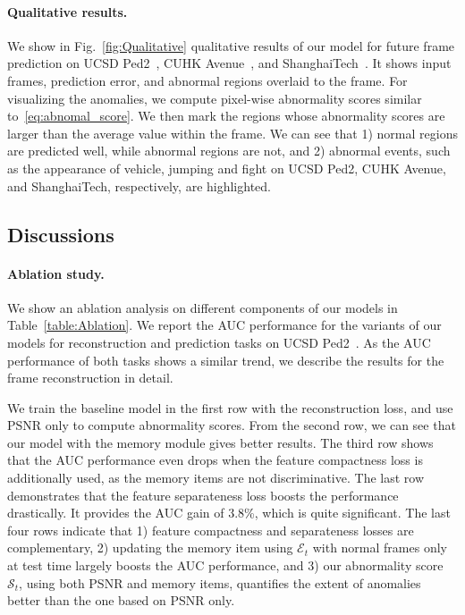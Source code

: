 \documentclass[10pt,twocolumn,letterpaper]{article}
\begin{document}
		
\vspace{-0.4cm}
		\paragraph{Qualitative results.}
We show in Fig.~\ref{fig:Qualitative} qualitative results of our model for future frame prediction on UCSD Ped2~\cite{li2013anomaly}, CUHK Avenue~\cite{lu2013abnormal}, and ShanghaiTech~\cite{luo2017revisit}. It shows input frames, prediction error, and abnormal regions overlaid to the frame. For visualizing the anomalies, we compute pixel-wise abnormality scores similar to~\eqref{eq:abnomal_score}. We then mark the regions whose abnormality scores are larger than the average value within the frame. We can see that 1) normal regions are predicted well, while abnormal regions are not, and 2) abnormal events, such as the appearance of vehicle, jumping and fight on UCSD Ped2, CUHK Avenue, and ShanghaiTech, respectively, are highlighted.



			
	
	
	\subsection{Discussions}\label{sec:discussion}
\vspace{-0.1cm}
		\paragraph{Ablation study.}
			We show an ablation analysis on different components of our models in Table~\ref{table:Ablation}. We report the AUC performance for the variants of our models for reconstruction and prediction tasks on UCSD Ped2~\cite{li2013anomaly}. As the AUC performance of both tasks shows a similar trend, we describe the results for the frame reconstruction in detail. 

We train the baseline model in the first row with the reconstruction loss, and use PSNR only to compute abnormality scores. From the second row, we can see that our model with the memory module gives better results. The third row shows that the AUC performance even drops when the feature compactness loss is additionally used, as the memory items are not discriminative. The last row demonstrates that the feature separateness loss boosts the performance drastically. It provides the AUC gain of 3.8\%, which is quite significant. The last four rows indicate that 1) feature compactness and separateness losses are complementary, 2) updating the memory item using $\mathcal{E}_t$ with normal frames only at test time largely boosts the AUC performance, and 3) our abnormality score~$\mathcal{S}_t$, using both PSNR and memory items, quantifies the extent of anomalies better than the one based on PSNR only. 
\end{document}
